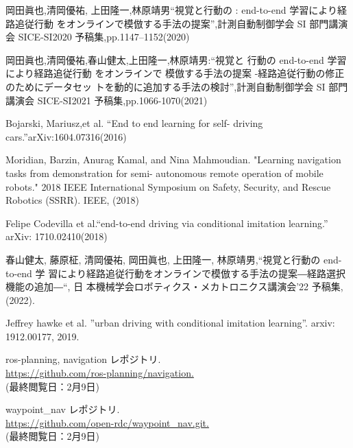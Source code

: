 \documentclass{jarticle}
\begin{document}
\footnotesize
\begin{thebibliography}{99}



岡田眞也,清岡優祐, 上田隆一,林原靖男“視覚と行動の : end-to-end 学習により経路追従行動 をオンラインで模倣する手法の提案”,計測自動制御学会 SI 部門講演会 SICE-SI2020 予稿集,pp.1147–1152(2020)

岡田眞也,清岡優祐,春山健太,上田隆一,林原靖男:“視覚と 行動の end-to-end 学習により経路追従行動 をオンラインで 模倣する手法の提案 -経路追従行動の修正のためにデータセッ トを動的に追加する手法の検討”,計測自動制御学会 SI 部門 講演会 SICE-SI2021 予稿集,pp.1066-1070(2021)

Bojarski, Mariusz,et al. “End to end learning for self- driving cars.”arXiv:1604.07316(2016)

Moridian, Barzin, Anurag Kamal, and Nina Mahmoudian. "Learning navigation tasks from demonstration for semi- autonomous remote operation of mobile robots." 2018 IEEE International Symposium on Safety, Security, and Rescue Robotics (SSRR). IEEE, (2018)

Felipe Codevilla et al.“end-to-end driving via conditional imitation learning.” arXiv: 1710.02410(2018)

春山健太, 藤原柾, 清岡優祐, 岡田眞也, 上田隆一, 林原靖男,“視覚と行動の end-to-end 学 習により経路追従行動をオンラインで模倣する手法の提案―経路選択機能の追加―“, 日 本機械学会ロボティクス・メカトロニクス講演会’22 予稿集,(2022).

Jeffrey hawke et al. ”urban driving with conditional imitation learning”. arxiv: 1912.00177, 2019.

ros-planning, navigation レポジトリ. \\\url{https://github.com/ros-planning/navigation.}\\
(最終閲覧日：2月9日)

waypoint\_nav レポジトリ. \\\url{https://github.com/open-rdc/waypoint_nav.git.}\\
(最終閲覧日：2月9日)


\end{thebibliography}

\normalsize
\end{document}
